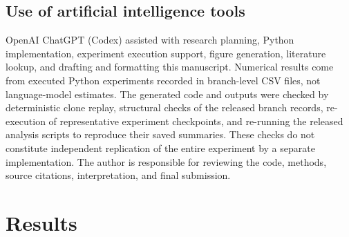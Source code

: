 \documentclass[10pt,letterpaper]{article}
\begin{document}
\subsection*{Use of artificial intelligence tools}
OpenAI ChatGPT (Codex) assisted with research planning, Python implementation, experiment execution support, figure generation, literature lookup, and drafting and formatting this manuscript. Numerical results come from executed Python experiments recorded in branch-level CSV files, not language-model estimates. The generated code and outputs were checked by deterministic clone replay, structural checks of the released branch records, re-execution of representative experiment checkpoints, and re-running the released analysis scripts to reproduce their saved summaries. These checks do not constitute independent replication of the entire experiment by a separate implementation. The author is responsible for reviewing the code, methods, source citations, interpretation, and final submission.

\section*{Results}
\end{document}
